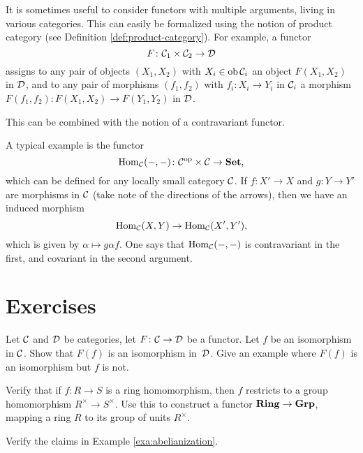 It is sometimes useful to consider functors with multiple arguments, living in various categories. This can easily be formalized using the notion of product category (see Definition \ref{def:product-category}). For example, a functor
\[
	F\colon {\mathcal{C}}_1 \times {\mathcal{C}}_2 \to {\mathcal{D}}
\]
assigns to any pair of objects $(X_1,X_2)$ with $X_i\in \operatorname{ob} {\mathcal{C}}_i$ an object $F(X_1,X_2)$ in ${\mathcal{D}}$, and to any pair of morphisms $(f_1,f_2)$ with $f_i\colon X_i\to Y_i$ in ${\mathcal{C}}_i$ a morphism $F(f_1,f_2) \colon F(X_1,X_2) \to F(Y_1,Y_2)$ in ${\mathcal{D}}$. 

This can be combined with the notion of a contravariant functor. 

\begin{example}\label{exa:hom-in-two-arguments}
A typical example is the functor
\[
	\operatorname{Hom}_{\mathcal{C}}(-,-) \colon {\mathcal{C}}^{\mathrm{op}} \times {\mathcal{C}} \to \mathbf{Set},
\]
which can be defined for any locally small category ${\mathcal{C}}$. If $f\colon X'\to X$ and $g\colon Y\to Y'$ are morphisms in ${\mathcal{C}}$ (take note of the directions of the arrows), then we have an induced morphism
\[	
	\operatorname{Hom}_{\mathcal{C}}(X,Y) \to \operatorname{Hom}_{\mathcal{C}}(X',Y'),
\]
which is given by $\alpha \mapsto g\alpha f$. One says that $\operatorname{Hom}_{\mathcal{C}}(-,-)$ is contravariant in the first, and covariant in the second argument.
\end{example}





\newpage
\section*{Exercises}



\begin{exercise}
Let ${\mathcal{C}}$ and ${\mathcal{D}}$ be categories, let $F\colon {\mathcal{C}} \to {\mathcal{D}}$ be a functor. Let $f$ be an isomorphism in ${\mathcal{C}}$. Show that $F(f)$ is an isomorphism
in~${\mathcal{D}}$.  Give an example where $F(f)$ is an isomorphism but $f$ is not.
\end{exercise}

\begin{exercise}
Verify that if $f\colon R\to S$ is a ring homomorphism, then $f$ restricts to a group homomorphism $R^\times \to S^\times$. Use this to construct a functor $\mathbf{Ring} \to \mathbf{Grp}$, mapping a ring $R$ to its group of units $R^\times$.
\end{exercise}


\begin{exercise}Verify the claims in Example \ref{exa:abelianization}.
\end{exercise}

